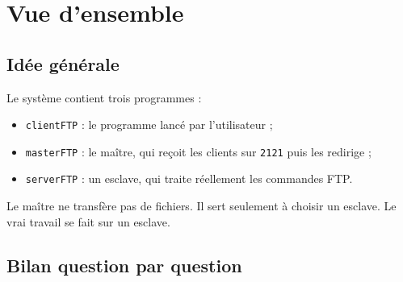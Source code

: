 \documentclass[a4paper,11pt]{article}
\begin{document}
\section{Vue d'ensemble}

\subsection{Idée générale}

Le système contient trois programmes :

\begin{itemize}[leftmargin=*]
    \item \texttt{clientFTP} : le programme lancé par l'utilisateur ;
    \item \texttt{masterFTP} : le maître, qui reçoit les clients sur
    \texttt{2121} puis les redirige ;
    \item \texttt{serverFTP} : un esclave, qui traite réellement les commandes
    FTP.
\end{itemize}

Le maître ne transfère pas de fichiers. Il sert seulement à choisir un esclave.
Le vrai travail se fait sur un esclave.

\subsection{Bilan question par question}
\end{document}
